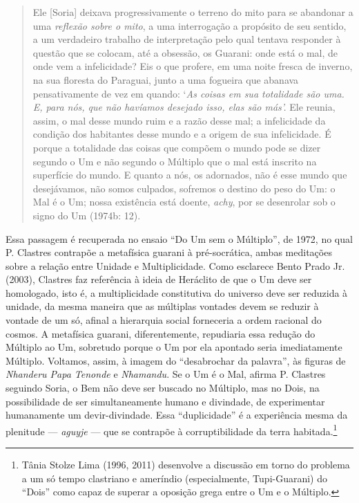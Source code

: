 {{\begin{quote}
Ele [Soria] deixava progressivamente o terreno do mito para se
abandonar a uma \emph{reflexão sobre o mito}, a uma interrogação a
propósito de seu sentido, a um verdadeiro trabalho de interpretação pelo
qual tentava responder à questão que se colocam, até a obsessão, os
Guarani: onde está o mal, de onde vem a infelicidade? Eis o que profere,
em uma noite fresca de inverno, na sua floresta do Paraguai, junto a uma
fogueira que abanava pensativamente de vez em quando: `\emph{As coisas
em sua totalidade são uma. E, para nós, que não havíamos desejado isso,
elas são más'.} Ele reunia, assim, o mal desse mundo ruim e a razão
desse mal; a infelicidade da condição dos habitantes desse mundo e a
origem de sua infelicidade. É porque a totalidade das coisas que compõem
o mundo pode se dizer segundo o Um e não segundo o Múltiplo que o mal
está inscrito na superfície do mundo. E quanto a nós, os adornados, não
é esse mundo que desejávamos, não somos culpados, sofremos o destino do
peso do Um: o Mal é o Um; nossa existência está doente, \emph{achy}, por se
desenrolar sob o signo do Um (1974b: 12).
\end{quote}

Essa passagem é recuperada no ensaio ``Do Um sem o Múltiplo'', de 1972, no
qual P. Clastres contrapõe a metafísica guarani à pré-socrática, ambas
meditações sobre a relação entre Unidade e Multiplicidade. Como
esclarece Bento Prado Jr. (2003), Clastres faz referência à ideia de
Heráclito de que o Um deve ser homologado, isto é, a multiplicidade
constitutiva do universo deve ser reduzida à unidade, da mesma maneira
que as múltiplas vontades devem se reduzir à vontade de um só, afinal a
hierarquia social forneceria a ordem racional do cosmos. A metafísica
guarani, diferentemente, repudiaria essa redução do Múltiplo ao Um,
sobretudo porque o Um por ela apontado seria imediatamente Múltiplo.
Voltamos, assim, à imagem do ``desabrochar da palavra'', às figuras de
\emph{Nhanderu Papa Tenonde} e \emph{Nhamandu}. Se o Um é o Mal, afirma P. Clastres
seguindo Soria, o Bem não deve ser buscado no Múltiplo, mas no Dois, na
possibilidade de ser simultaneamente humano e divindade, de
experimentar humanamente um devir-divindade. Essa ``duplicidade'' é a
experiência mesma da plenitude --- \emph{aguyje} --- que se contrapõe à
corruptibilidade da terra habitada.\footnote{Tânia Stolze Lima (1996,
2011) desenvolve a discussão em torno do problema a um só tempo
clastriano e ameríndio (especialmente, Tupi-Guarani) do ``Dois'' como
capaz de superar a oposição grega entre o Um e o Múltiplo.}

}}
